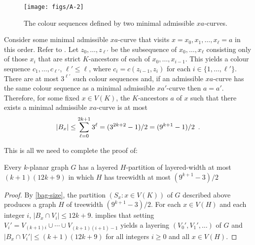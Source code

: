 \documentclass{patmorin}
\begin{document}
\begin{figure}
  \begin{center}
      \texttt{[image: figs/A-2]}
  \end{center}
  \caption{The colour sequences defined by two minimal admissible $xa$-curves.}
\end{figure}

Consider some minimal admissible $xa$-curve that visits $x=x_0,x_1,\ldots,x_\ell=a$ in this order.  Refer to .  Let $z_0,\ldots,z_{\ell'}$ be the subsequence of $x_0,\ldots,x_\ell$ consisting only of those $x_i$ that are strict $K$-ancestors of each of $x_0,\ldots,x_{i-1}$.  This yields a colour sequence $c_1,\ldots,c_{\ell'}$, $\ell'\le \ell$, where $c_i=c(z_{i-1},z_i)$ for each $i\in\{1,\ldots,\ell'\}$.   There are at most $3^{\ell'}$ such colour sequences and, if an admissible $xa$-curve has the same colour sequence as a minimal admissible $xa'$-curve then $a=a'$.  Therefore, for some fixed $x\in V(K)$, the $K$-ancestors $a$ of $x$ such that there exists a minimal admissible $xa$-curve is at most
\begin{equation}
   |B_x| \le \sum_{\ell=0}^{2k+1} 3^\ell = (3^{2k+2}-1)/2 
       = (9^{k+1}-1)/2 \enspace .  \eqlabel{bag-size}
\end{equation}

This is all we need to complete the proof of:

\begin{thm}
    Every $k$-planar graph $G$ has a layered $H$-partition of layered-width at most $(k+1)(12k + 9)$ in which $H$ has treewidth at most $(9^{k+1}-3)/2$
\end{thm}

\begin{proof}
  By \eqref{bag-size}, the partition $(S_x:x\in V(K))$ of $G$ described above produces a graph $H$ of treewidth $(9^{k+1}-3)/2$.  For each $x\in V(H)$ and each integer $i$, $|B_x\cap V_i|\le 12k+9$.  implies that setting $V_i' = V_{(k+1)i}\cup\cdots\cup V_{(k+1)(i+1)-1}$ yields a layering $(V_0',V_1',\ldots)$ of  $G$ and $|B_x\cap V_i'|\le (k+1)(12k+9)$ for all integers $i\ge 0$ and all $x\in V(H)$.
\end{proof}



\end{document}
